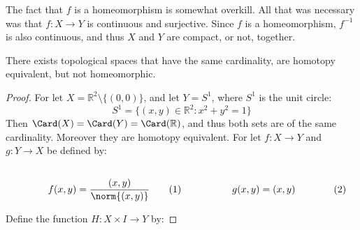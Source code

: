 \documentclass[crop=false,class=book,oneside]{standalone}                      %
\begin{document}
            The fact that $f$ is a homeomorphism is somewhat overkill.
            All that was necessary was that $f:X\rightarrow{Y}$ is continuous
            and surjective. Since $f$ is a homeomorphism, $f^{-1}$ is also
            continuous, and thus $X$ and $Y$ are compact, or not, together.
            \begin{theorem}
                \label{thm:Homotopy_Equivalance_of_Plane_without_point_%
                       and_unit_disc_but_not_homeomorphic}
                There exists topological spaces that have the same cardinality,
                are homotopy equivalent, but not homeomorphic.
            \end{theorem}
            \begin{proof}
                For let $X=\mathbb{R}^{2}\setminus\{(0,0)\}$,
                and let $Y=S^{1}$, where $S^{1}$ is the unit circle:
                \begin{equation}
                    S^{1}=\{(x,y)\in\mathbb{R}^{2}:x^{2}+y^{2}=1\}
                \end{equation}
                Then $\Card(X)=\Card(Y)=\Card(\mathbb{R})$, and thus
                both sets are of the same cardinality. Moreover they
                are homotopy equivalent. For let $f:{X}\rightarrow{Y}$ and
                $g:{Y}\rightarrow{X}$ be defined by:
                \par
                \begin{subequations}
                    \begin{minipage}[b]{0.49\textwidth}
                        \centering
                        \begin{equation}
                            f(x,y)=\frac{(x,y)}{\norm{(x,y)}}
                        \end{equation}
                    \end{minipage}
                    \hfill
                    \begin{minipage}[b]{0.49\textwidth}
                        \centering
                        \begin{equation}
                            g(x,y)=(x,y)
                        \end{equation}
                    \end{minipage}
                \end{subequations}
                \par\vspace{2.5ex}
                Define the function $H:X\times{I}\rightarrow{Y}$ by:

\end{proof}
\end{document}
